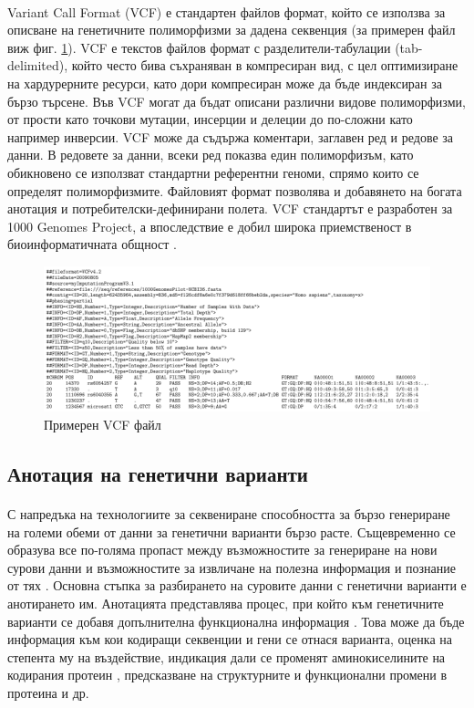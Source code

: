 \documentclass[pdftex,cyrillic,14pt,a4page,twoside]{extreport}
\begin{document}
\paragraph{}
Variant Call Format (VCF) е стандартен файлов формат, който се използва за описване на генетичните полиморфизми за дадена секвенция (за примерен файл виж фиг. \ref{fig:example_vcf}). VCF е текстов файлов формат с разделители-табулации (tab-delimited), който често бива съхраняван в компресиран вид, с цел оптимизиране на хардурерните ресурси, като дори компресиран може да бъде индексиран за бързо търсене. Във VCF могат да бъдат описани различни видове полиморфизми, от прости като точкови мутации, инсерции и делеции до по-сложни като например инверсии. VCF може да съдържа коментари, заглавен ред и редове за данни. В редовете за данни, всеки ред показва един полиморфизъм, като обикновено се използват стандартни референтни геноми, спрямо които се определят полиморфизмите. Файловият формат позволява и добавянето на богата анотация и потребителски-дефинирани полета. VCF стандартът е разработен за 1000 Genomes Project, а впоследствие е добил широка приемственост в биоинформатичната общност \cite{danecek2011}.

\begin{figure}[h]
  \centering
  \includegraphics[width=17cm]{figures/vcf}
  \caption {Примерен VCF файл}
  \label{fig:example_vcf}
\end{figure}


\subsection{Анотация на генетични варианти}
\paragraph{}
С напредъка на технологиите за секвениране способността за бързо генериране на големи обеми от данни за генетични варианти бързо расте. Същевременно се образува все по-голяма пропаст между възможностите за генериране на нови сурови данни и възможностите за извличане на полезна информация и познание от тях \cite{yang2015}. Основна стъпка за разбирането на суровите данни с генетични варианти е анотирането им. Анотацията представлява процес, при който към генетичните варианти се добавя допълнителна функционална информация \cite{mccarthy2014}. Това може да бъде информация към кои кодиращи секвенции и гени се отнася варианта, оценка на степента му на въздействие, индикация дали се променят аминокиселините на кодирания протеин \cite{cingolani2012}, предсказване на структурните и функционални промени в протеина \cite{mccarthy2014} и др.
\end{document}
